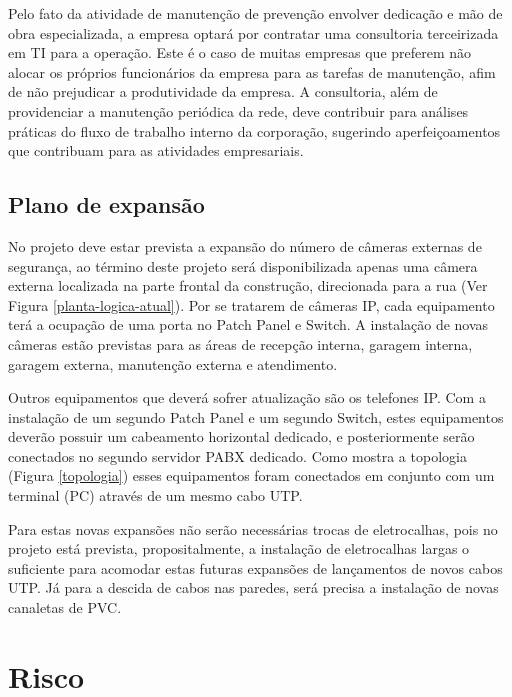 \documentclass[	DIV=calc,%
							paper=a4,%
							fontsize=12pt,%
							onecolumn]{scrartcl}	 					%
\begin{document}
Pelo fato da atividade de manutenção de prevenção envolver dedicação e mão de obra especializada, a empresa optará por contratar uma consultoria terceirizada em TI para a operação. Este é o caso de muitas empresas que preferem não alocar os próprios funcionários da empresa para as tarefas de manutenção, afim de não prejudicar a produtividade da empresa. A consultoria, além de providenciar a manutenção periódica da rede, deve contribuir para análises práticas do fluxo de trabalho interno da corporação, sugerindo aperfeiçoamentos que contribuam para as atividades empresariais.

\subsection{Plano de expansão}

No projeto deve estar prevista a expansão do número de câmeras externas de segurança, ao término deste projeto será disponibilizada apenas uma câmera externa localizada na parte frontal da construção, direcionada para a rua (Ver Figura \ref{planta-logica-atual}). Por se tratarem de câmeras IP, cada equipamento terá a ocupação de uma porta no Patch Panel e Switch. A instalação de novas câmeras estão previstas para as áreas de recepção interna, garagem interna, garagem externa, manutenção externa e atendimento.

Outros equipamentos que deverá sofrer atualização são os telefones IP. Com a instalação de um segundo Patch Panel e um segundo Switch, estes equipamentos deverão possuir um cabeamento horizontal dedicado, e posteriormente serão conectados no segundo servidor PABX dedicado. Como mostra a topologia (Figura \ref{topologia}) esses equipamentos foram conectados em conjunto com um terminal (PC) através de um mesmo cabo UTP.

Para estas novas expansões não serão necessárias trocas de eletrocalhas, pois no projeto está prevista, propositalmente, a instalação de eletrocalhas largas o suficiente para acomodar estas futuras expansões de lançamentos de novos cabos UTP. Já para a descida de cabos nas paredes, será precisa a instalação de novas canaletas de PVC.

\section{Risco}
\end{document}
